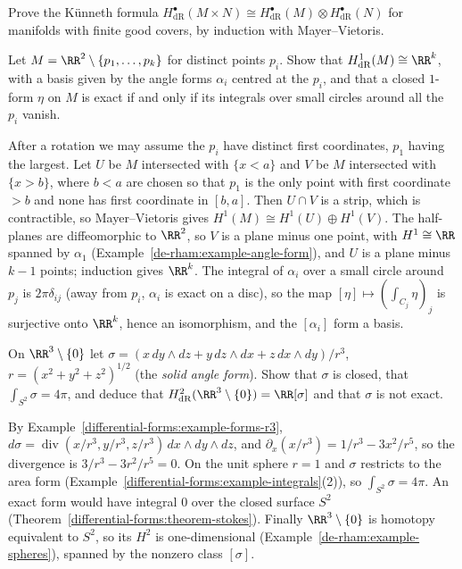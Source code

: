 \begin{exercise}\label{de-rham:exercise-kunneth-de-rham}
Prove the K\"unneth formula $H^\bullet_{\mathrm{dR}}(M \times N) \cong H^\bullet_{\mathrm{dR}}(M) \otimes H^\bullet_{\mathrm{dR}}(N)$ for manifolds with finite good covers, by induction with Mayer--Vietoris.
\end{exercise}

\begin{exercise}\label{de-rham:exercise-punctured-plane}
Let $M = \RR^2 \setminus \{p_1, \ldots, p_k\}$ for distinct points $p_i$. Show that $H^1_{\mathrm{dR}}(M) \cong \RR^k$, with a basis given by the angle forms $\alpha_i$ centred at the $p_i$,
and that a closed $1$-form $\eta$ on $M$ is exact if and only if its integrals over small circles around all the $p_i$ vanish.
\end{exercise}

\begin{solution}
After a rotation we may assume the $p_i$ have distinct first coordinates, $p_1$ having the largest. Let $U$ be $M$ intersected with $\{x < a\}$ and $V$ be $M$ intersected with
$\{x > b\}$, where $b < a$ are chosen so that $p_1$ is the only point with first coordinate $> b$ and none has first coordinate in $[b, a]$. Then $U \cap V$ is a strip, which is
contractible, so Mayer--Vietoris gives $H^1(M) \cong H^1(U) \oplus H^1(V)$. The half-planes are diffeomorphic to $\RR^2$, so $V$ is a plane minus one point, with $H^1 \cong \RR$ spanned by
$\alpha_1$ (Example~\ref{de-rham:example-angle-form}), and $U$ is a plane minus $k - 1$ points; induction gives $\RR^k$. The integral of $\alpha_i$ over a small circle around $p_j$ is
$2\pi\delta_{ij}$ (away from $p_i$, $\alpha_i$ is exact on a disc), so the map $[\eta] \mapsto (\int_{C_j}\eta)_j$ is surjective onto $\RR^k$, hence an isomorphism, and the $[\alpha_i]$ form a basis.
\end{solution}

\begin{exercise}\label{de-rham:exercise-solid-angle}
On $\RR^3 \setminus \{0\}$ let $\sigma = (x\,dy \wedge dz + y\,dz \wedge dx + z\,dx \wedge dy)/r^3$, $r = (x^2 + y^2 + z^2)^{1/2}$ (the \emph{solid angle form}). Show that $\sigma$ is closed, that
$\int_{S^2}\sigma = 4\pi$, and deduce that $H^2_{\mathrm{dR}}(\RR^3 \setminus \{0\}) = \RR[\sigma]$ and that $\sigma$ is not exact.
\end{exercise}

\begin{solution}
By Example~\ref{differential-forms:example-forms-r3}, $d\sigma = \operatorname{div}(x/r^3, y/r^3, z/r^3)\,dx \wedge dy \wedge dz$, and $\partial_x(x/r^3) = 1/r^3 - 3x^2/r^5$, so the divergence is
$3/r^3 - 3r^2/r^5 = 0$. On the unit sphere $r = 1$ and $\sigma$ restricts to the area form (Example~\ref{differential-forms:example-integrals}(2)), so $\int_{S^2}\sigma = 4\pi$. An exact form would have
integral $0$ over the closed surface $S^2$ (Theorem~\ref{differential-forms:theorem-stokes}). Finally $\RR^3 \setminus \{0\}$ is homotopy equivalent to $S^2$, so its $H^2$ is one-dimensional
(Example~\ref{de-rham:example-spheres}), spanned by the nonzero class $[\sigma]$.
\end{solution}

